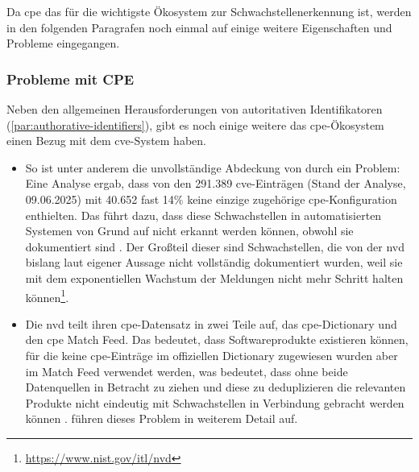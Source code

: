 Da \acrshort{cpe} das für die \metaeffektsp wichtigste Ökosystem zur Schwachstellenerkennung ist, werden in den folgenden Paragrafen noch einmal auf einige weitere Eigenschaften und Probleme eingegangen.

\subsubsection{Probleme mit CPE}

Neben den allgemeinen Herausforderungen von autoritativen Identifikatoren (\autoref{par:authorative-identifiers}), gibt es noch einige weitere das \acrshort{cpe}-Ökosystem einen Bezug mit dem \acrshort{cve}-System haben.

\begin{itemize}
    \item So ist unter anderem die unvollständige Abdeckung von  durch  ein Problem:
    Eine Analyse ergab, dass von den 291.389 \acrshort{cve}-Einträgen (Stand der Analyse, 09.06.2025) mit 40.652 fast 14\% keine einzige zugehörige \acrshort{cpe}-Konfiguration enthielten.
    Das führt dazu, dass diese Schwachstellen in automatisierten Systemen von Grund auf nicht erkannt werden können, obwohl sie dokumentiert sind \autocite{Sanguino_Uetz_2017}.
    Der Großteil dieser  sind Schwachstellen, die von der \acrshort{nvd} bislang laut eigener Aussage nicht vollständig dokumentiert wurden, weil sie mit dem exponentiellen Wachstum der Meldungen nicht mehr Schritt halten können\footnote{\url{https://www.nist.gov/itl/nvd}}.

    \item Die \acrshort{nvd} teilt ihren \acrshort{cpe}-Datensatz in zwei Teile auf, das \acrshort{cpe}-Dictionary \autocite{Cichonski_Waltermire_Scarfone_2011} und den \acrshort{cpe} Match Feed.
    Das bedeutet, dass Softwareprodukte existieren können, für die keine \acrshort{cpe}-Einträge im offiziellen Dictionary zugewiesen wurden aber im Match Feed verwendet werden, was bedeutet, dass ohne beide Datenquellen in Betracht zu ziehen und diese zu deduplizieren die relevanten Produkte nicht eindeutig mit Schwachstellen in Verbindung gebracht werden können \autocite{Sanguino_Uetz_2017}.
    \textcite{Sanguino_Uetz_2017} führen dieses Problem in weiterem Detail auf.


\end{itemize}
